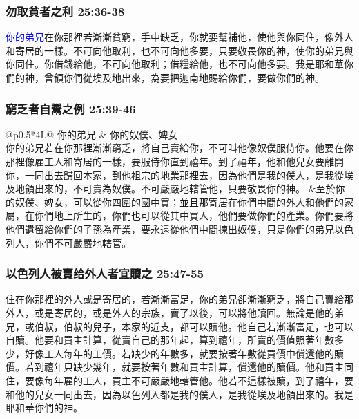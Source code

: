 \subsubsection{勿取貧者之利 25:36-38}
\textcolor{blue}{你的弟兄}在你那裡若漸漸貧窮，手中缺乏，你就要幫補他，使他與你同住，像外人和寄居的一樣。不可向他取利，也不可向他多要，只要敬畏你的神，使你的弟兄與你同住。你借錢給他，不可向他取利；借糧給他，也不可向他多要。我是耶和華你們的神，曾領你們從埃及地出來，為要把迦南地賜給你們，要做你們的神。

\subsubsection{窮乏者自鬻之例 25:39-46}
\begin{table}[H]
\begin{threeparttable}
\begin{tabular}{@{}p{}*{4}{L{\tabcolsep\relax}}@{}}
\toprule
你的弟兄 &  你的奴僕、婢女 \\\hline
你的弟兄若在你那裡漸漸窮乏，將自己賣給你，不可叫他像奴僕服侍你。他要在你那裡像雇工人和寄居的一樣，要服侍你直到禧年。到了禧年，他和他兒女要離開你，一同出去歸回本家，到他祖宗的地業那裡去，因為他們是我的僕人，是我從埃及地領出來的，不可賣為奴僕。不可嚴嚴地轄管他，只要敬畏你的神。
&至於你的奴僕、婢女，可以從你四圍的國中買；並且那寄居在你們中間的外人和他們的家屬，在你們地上所生的，你們也可以從其中買人，他們要做你們的產業。你們要將他們遺留給你們的子孫為產業，要永遠從他們中間揀出奴僕，只是你們的弟兄以色列人，你們不可嚴嚴地轄管。\\\hline
\bottomrule
\end{tabular}
\caption{窮乏者自鬻之例}
\end{threeparttable}
\end{table} 

\subsubsection{以色列人被賣给外人者宜贖之 25:47-55}
住在你那裡的外人或是寄居的，若漸漸富足，你的弟兄卻漸漸窮乏，將自己賣給那外人，或是寄居的，或是外人的宗族，賣了以後，可以將他贖回。無論是他的弟兄，或伯叔，伯叔的兒子，本家的近支，都可以贖他。他自己若漸漸富足，也可以自贖。他要和買主計算，從賣自己的那年起，算到禧年，所賣的價值照著年數多少，好像工人每年的工價。若缺少的年數多，就要按著年數從買價中償還他的贖價。若到禧年只缺少幾年，就要按著年數和買主計算，償還他的贖價。他和買主同住，要像每年雇的工人，買主不可嚴嚴地轄管他。他若不這樣被贖，到了禧年，要和他的兒女一同出去，因為以色列人都是我的僕人，是我從埃及地領出來的。我是耶和華你們的神。


